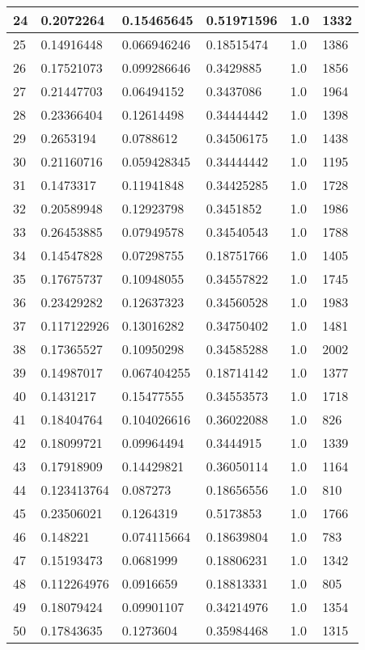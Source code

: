 \begin{longtable}{|l|l|l|l|l|l|}
24 & 0.2072264 & 0.15465645 & 0.51971596 & 1.0 & 1332 \\ \hline 
25 & 0.14916448 & 0.066946246 & 0.18515474 & 1.0 & 1386 \\ \hline 
26 & 0.17521073 & 0.099286646 & 0.3429885 & 1.0 & 1856 \\ \hline 
27 & 0.21447703 & 0.06494152 & 0.3437086 & 1.0 & 1964 \\ \hline 
28 & 0.23366404 & 0.12614498 & 0.34444442 & 1.0 & 1398 \\ \hline 
29 & 0.2653194 & 0.0788612 & 0.34506175 & 1.0 & 1438 \\ \hline 
30 & 0.21160716 & 0.059428345 & 0.34444442 & 1.0 & 1195 \\ \hline 
31 & 0.1473317 & 0.11941848 & 0.34425285 & 1.0 & 1728 \\ \hline 
32 & 0.20589948 & 0.12923798 & 0.3451852 & 1.0 & 1986 \\ \hline 
33 & 0.26453885 & 0.07949578 & 0.34540543 & 1.0 & 1788 \\ \hline 
34 & 0.14547828 & 0.07298755 & 0.18751766 & 1.0 & 1405 \\ \hline 
35 & 0.17675737 & 0.10948055 & 0.34557822 & 1.0 & 1745 \\ \hline 
36 & 0.23429282 & 0.12637323 & 0.34560528 & 1.0 & 1983 \\ \hline 
37 & 0.117122926 & 0.13016282 & 0.34750402 & 1.0 & 1481 \\ \hline 
38 & 0.17365527 & 0.10950298 & 0.34585288 & 1.0 & 2002 \\ \hline 
39 & 0.14987017 & 0.067404255 & 0.18714142 & 1.0 & 1377 \\ \hline 
40 & 0.1431217 & 0.15477555 & 0.34553573 & 1.0 & 1718 \\ \hline 
41 & 0.18404764 & 0.104026616 & 0.36022088 & 1.0 & 826 \\ \hline 
42 & 0.18099721 & 0.09964494 & 0.3444915 & 1.0 & 1339 \\ \hline 
43 & 0.17918909 & 0.14429821 & 0.36050114 & 1.0 & 1164 \\ \hline 
44 & 0.123413764 & 0.087273 & 0.18656556 & 1.0 & 810 \\ \hline 
45 & 0.23506021 & 0.1264319 & 0.5173853 & 1.0 & 1766 \\ \hline 
46 & 0.148221 & 0.074115664 & 0.18639804 & 1.0 & 783 \\ \hline 
47 & 0.15193473 & 0.0681999 & 0.18806231 & 1.0 & 1342 \\ \hline 
48 & 0.112264976 & 0.0916659 & 0.18813331 & 1.0 & 805 \\ \hline 
49 & 0.18079424 & 0.09901107 & 0.34214976 & 1.0 & 1354 \\ \hline 
50 & 0.17843635 & 0.1273604 & 0.35984468 & 1.0 & 1315 \\ \hline 
\end{longtable}